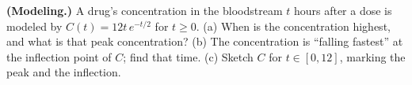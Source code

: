 \begin{exercise}\label{ch16:exJ}
\textbf{(Modeling.)} A drug's concentration in the bloodstream $t$ hours after a
dose is modeled by $C(t)=12t\,e^{-t/2}$ for $t\ge0$. (a) When is the concentration
highest, and what is that peak concentration? (b) The concentration is ``falling
fastest'' at the inflection point of $C$; find that time. (c) Sketch $C$ for
$t\in[0,12]$, marking the peak and the inflection.
\end{exercise}
